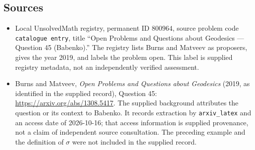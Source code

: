 \documentclass[11pt]{article}
\begin{document}
\subsection{Sources}
\begin{itemize}
\item Local UnsolvedMath registry, permanent ID \(800964\), source problem code \texttt{catalogue entry}, title ``Open Problems and Questions about Geodesics --- Question 45 (Babenko).'' The registry lists Burns and Matveev as proposers, gives the year 2019, and labels the problem open. This label is supplied registry metadata, not an independently verified assessment.
\item Burns and Matveev, \emph{Open Problems and Questions about Geodesics} (2019, as identified in the supplied record), Question 45: \url{https://arxiv.org/abs/1308.5417}. The supplied background attributes the question or its context to Babenko. It records extraction by \texttt{arxiv\_latex} and an access date of 2026-10-16; that access information is supplied provenance, not a claim of independent source consultation. The preceding example and the definition of \(\sigma\) were not included in the supplied record.
\end{itemize}
\end{document}
